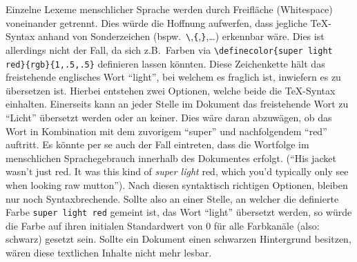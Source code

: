 Einzelne Lexeme menschlicher Sprache werden durch Freifläche (Whitespace) voneinander getrennt. Dies würde die Hoffnung aufwerfen, dass jegliche \TeX{}-Syntax anhand von Sonderzeichen (bspw.\ \verb|\|,\verb|{|,\verb|}|,\ldots) erkennbar wäre. Dies ist allerdings nicht der Fall, da sich z.B.\ Farben via \verb|\definecolor{super light red}{rgb}{1,.5,.5}| definieren lassen könnten. Diese Zeichenkette hält das freistehende englisches Wort \enquote{light}, bei welchem es fraglich ist, inwiefern es zu übersetzen ist. Hierbei entstehen zwei Optionen, welche beide die \TeX{}-Syntax einhalten. Einerseits kann an jeder Stelle im Dokument das freistehende Wort zu \enquote{Licht} übersetzt werden oder an keiner. Dies wäre daran abzuwägen, ob das Wort in Kombination mit dem zuvorigem \enquote{super} und nachfolgendem \enquote{red} auftritt. Es könnte per se auch der Fall eintreten, dass die Wortfolge im menschlichen Sprachegebrauch innerhalb des Dokumentes erfolgt. (\enquote{His jacket wasn't just red. It was this kind of \textit{super light} red, which you'd typically only see when looking raw mutton}). Nach diesen syntaktisch richtigen Optionen, bleiben nur noch Syntaxbrechende. Sollte also an einer Stelle, an welcher die definierte Farbe \texttt{super light red} gemeint ist, das Wort \enquote{light} übersetzt werden, so würde die Farbe auf ihren initialen Standardwert von $0$ für alle Farbkanäle (also: schwarz) gesetzt sein. Sollte ein Dokument einen schwarzen Hintergrund besitzen, wären diese textlichen Inhalte nicht mehr lesbar.\\\noindent



